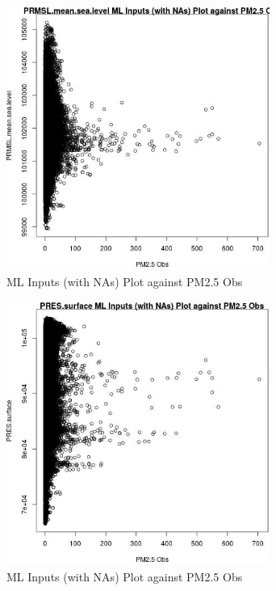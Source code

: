 \begin{figure} 
\centering  
\includegraphics[width=0.77\textwidth]{Code_Outputs/Report_ML_input_PM25_Step4_part_e_de_duplicated_aves_compiled_2019-05-14wNAs_PRMSLmeansealevelvPM25_Obs.jpg} 
\caption{\label{fig:Report_ML_input_PM25_Step4_part_e_de_duplicated_aves_compiled_2019-05-14wNAsPRMSLmeansealevelvPM25_Obs}ML Inputs (with NAs) Plot against PM2.5 Obs} 
\end{figure} 
 

\begin{figure} 
\centering  
\includegraphics[width=0.77\textwidth]{Code_Outputs/Report_ML_input_PM25_Step4_part_e_de_duplicated_aves_compiled_2019-05-14wNAs_PRESsurfacevPM25_Obs.jpg} 
\caption{\label{fig:Report_ML_input_PM25_Step4_part_e_de_duplicated_aves_compiled_2019-05-14wNAsPRESsurfacevPM25_Obs}ML Inputs (with NAs) Plot against PM2.5 Obs} 
\end{figure} 
 

